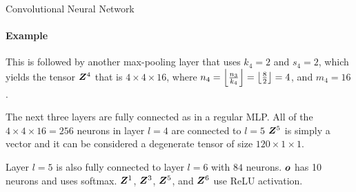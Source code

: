 \begin{frame}{Convolutional Neural Network}
\framesubtitle{Example}

\vspace*{-0.5cm}

    This is followed
    by another max-pooling layer that uses $k_4=2$ and $s_4=2$, which
    yields the tensor ${\boldsymbol Z}^4$ that is $4 \times 4 \times 16$, where 
    $n_4 = \left\lfloor \tfrac{n_3}{k_4} \right\rfloor = 
    \left\lfloor\tfrac{8}{2}\right\rfloor = 4$, and $m_4 = 16$.

\medskip

    The next three layers are fully connected as in a regular MLP. All
    of the $4\times 4\times 16 = 256$ neurons in layer $l=4$ are
    connected to $l=5$ ${\boldsymbol Z}^5$ is
    simply a vector and it can be considered a
    degenerate tensor of size $120 \times 1 \times 1$. 

	\medskip

Layer $l=5$ is
    also fully connected to layer $l=6$ with $84$ neurons.
${\boldsymbol o}$
    has 10 neurons and uses softmax.
    ${\boldsymbol Z}^1$, ${\boldsymbol Z}^3$, ${\boldsymbol Z}^5$, and ${\boldsymbol Z}^6$ use
    ReLU activation.


\end{frame}
